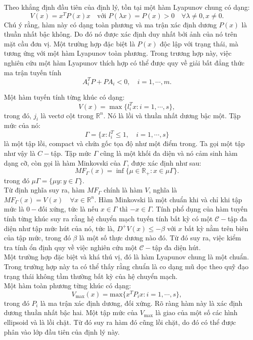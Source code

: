 \documentclass[14pt,a4paper,oneside]{report}		%
\begin{document}
Theo khẳng định đầu tiên của định lý, tồn tại một hàm Lyapunov chung có dạng:
$$V(x)=x^TP(x)x\quad\text{với }P(\lambda x)=P(x)>0\quad\forall\lambda\neq
 0,x\neq 0.$$
Chú ý rằng, hàm này có dạng toàn phương và ma trận xác định dương $P(x)$ là thuần nhất bậc không. Do đó nó được xác định duy nhất bởi ảnh của nó trên mặt cầu đơn vị. Một trường hợp đặc biệt là $P(x)$ độc lập với trạng thái, mà tương ứng với một hàm Lyapunov toàn phương. Trong trương hợp này, việc nghiên cứu một hàm Lyapunov thích hợp có thể được quy về giải bất đẳng thức ma trận tuyến tính
$$A_i^TP+PA_i<0,\quad i=1,\cdots,m.$$

Một hàm tuyến tính từng khúc có dạng:
$$V(x)=\max\{l_i^Tx:i=1,\cdots,s\},$$
trong đó, $j_i$ là vectơ cột trong $\mathbb{R}^n$. Nó là lồi và thuần nhất dương bậc một. Tập mức của nó:
$$\Gamma = \{x:l_i^T\leq1,\quad i=1,\cdots,s\}$$
là một tập lồi, compact và chứa gốc tọa độ như một điểm trong. Ta gọi một tập như vậy là $C-$tập. Tập mức $\Gamma$ cũng là một khối đa diện và nó cảm sinh hàm dạng cỡ, còn gọi là hàm Minkovski của $\Gamma$, được xác định như sau:
$$MF_\Gamma(x)=\inf\{\mu\in\mathbb{R}_+:x\in\mu\Gamma\}.$$
trong đó $\mu\Gamma = \{\mu y:y\in\Gamma\}.$\\

Từ định nghĩa suy ra, hàm $MF_\Gamma$ chính là hàm $V$, nghĩa là $MF_\Gamma(x)=V(x)\quad \forall x\in\mathbb{R}^n$. Hàm Minkovski là một chuẩn khi và chỉ khi tập mức là $0-$đối xứng, tức là nếu $x\in\Gamma$ thì $-x\in\Gamma$. Tính phổ dụng của hàm tuyến tính từng khúc suy ra rằng hệ chuyển mạch tuyến tính bất kỳ có một $\mathcal{C}-$tập đa diện như tập mức hút của nó, tức là, $D^+V(x)\leq -\beta$ với $x$ bất kỳ nằm trên biên của tập mức, trong đó $\beta$ là một số thực dương nào đó. Từ đó suy ra, việc kiểm tra tính ổn định quy về việc nghiên cứu một $\mathcal{C}-$tập đa diện hút.\\

Một trường hợp đặc biệt và khá thú vị, đó là hàm Lyapunov chung là một chuẩn. Trong trường hợp này ta có thể thấy rằng chuẩn là co dạng mũ dọc theo quỹ đạo trạng thái không tầm thường bất kỳ của hệ chuyển mạch.\\

Một hàm toàn phương từng khúc có dạng:
$$V_{\text{max}} (x)=\text{max}\{x^TP_ix:i=1,\cdots,s\},$$
trong đó $P_i$ là ma trận xác định dương, đối xứng. Rõ ràng hàm này là xác định dương thuần nhất bậc hai. Một tập mức của $V_\text{max}$ là giao của một số các hình ellipsoid và là lồi chặt. Từ đó suy ra hàm đó cũng lồi chặt, do đó có thể được phân vào lớp đầu tiên của định lý này.\\
\end{document}

